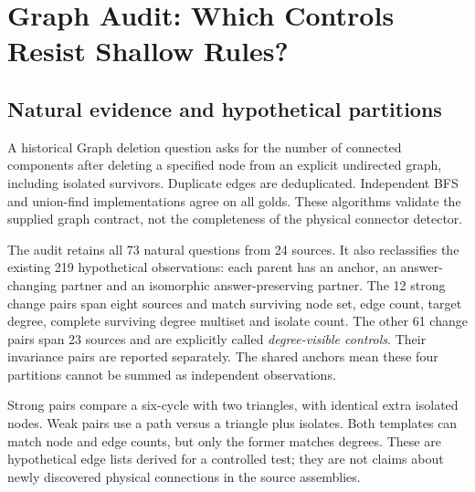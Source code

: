 \documentclass[10pt,twocolumn,letterpaper]{article}
\begin{document}
\begin{table}[t]
\centering\small
\caption{Current primary visual inventory. QA final counts completed
human decisions, not rendered images. Completed model runs are
0/9 planned. Both-decidable coverage is 0/140 pairs; this is an
evidence-availability count, not model accuracy.}
\label{tab:inventory}

\end{table}

\section{Graph Audit: Which Controls Resist Shallow Rules?}
\begin{table}[t]
\centering\small
\caption{Computed algorithm outputs, not learned-model results.
Natural correct items and hypothetical both-correct pairs use distinct
source-held-out fits. Strong change is a small proof of concept;
degree-visible controls support a weaker claim. Invariance reuses anchors.}
\label{tab:graph}

\end{table}

\subsection{Natural evidence and hypothetical partitions}
A historical Graph deletion question asks for the number of connected
components after deleting a specified node from an explicit undirected
graph, including isolated survivors. Duplicate edges are deduplicated.
Independent BFS and union-find implementations agree on all golds.
These algorithms validate the supplied graph contract, not the
completeness of the physical connector detector.

The audit retains all 73 natural questions from 24 sources. It also
reclassifies the existing 219 hypothetical observations: each parent
has an anchor, an answer-changing partner and an isomorphic
answer-preserving partner. The 12 strong change pairs span eight
sources and match surviving node set, edge count, target degree,
complete surviving degree multiset and isolate count. The other
61 change pairs span 23 sources and are explicitly called
\emph{degree-visible controls}. Their invariance pairs are reported
separately. The shared anchors mean these four partitions cannot
be summed as independent observations.

Strong pairs compare a six-cycle with two triangles, with identical
extra isolated nodes. Weak pairs use a path versus a triangle plus
isolates. Both templates can match node and edge counts, but only the
former matches degrees. These are hypothetical edge lists derived
for a controlled test; they are not claims about newly discovered
physical connections in the source assemblies.
\end{document}
